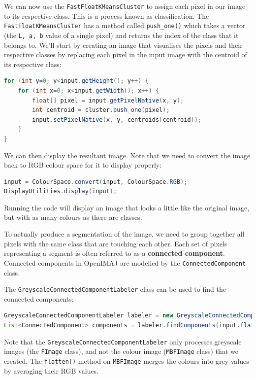 \documentclass[10pt,a4paper,twoside,extrafontsizes]{memoir}
\begin{document}
We can now use the \verb+FastFloatKMeansCluster+ to assign each pixel in our image to its respective 
class. This is a process known as classification. The \verb+FastFloatKMeansCluster+ has a method 
called \verb+push_one()+ which takes a vector (the \verb+L, a, b+ value of a single pixel) and 
returns the index of the class that it belongs to. We'll start by creating an image that 
visualises the pixels and their respective classes by replacing each pixel in the input image 
with the centroid of its respective class:
\begin{lstlisting}[language=java]
for (int y=0; y<input.getHeight(); y++) {
    for (int x=0; x<input.getWidth(); x++) {
        float[] pixel = input.getPixelNative(x, y);
        int centroid = cluster.push_one(pixel);
        input.setPixelNative(x, y, centroids[centroid]);
    }
}
\end{lstlisting}
We can then display the resultant image. Note that we need to convert the image back to RGB 
colour space for it to display properly:
\begin{lstlisting}[language=java]
input = ColourSpace.convert(input, ColourSpace.RGB);
DisplayUtilities.display(input);
\end{lstlisting}
Running the code will display an image that looks a little like the original image, but with 
as many colours as there are classes.

To actually produce a segmentation of the image, we need to group together all pixels with 
the same class that are touching each other. Each set of pixels representing a segment is 
often referred to as a \textbf{connected component}. Connected components in OpenIMAJ are
modelled by the \verb+ConnectedComponent+ class.

The \verb+GreyscaleConnectedComponentLabeler+ class can be used to find the connected components:
\begin{lstlisting}[language=java]
GreyscaleConnectedComponentLabeler labeler = new GreyscaleConnectedComponentLabeler();
List<ConnectedComponent> components = labeler.findComponents(input.flatten());
\end{lstlisting}
Note that the \verb+GreyscaleConnectedComponentLabeler+ 
only processes greyscale images 
(the \verb+FImage+ class), and not the colour image (\verb+MBFImage+ class) that we created. 
The \verb+flatten()+ method on \verb+MBFImage+ merges the colours into grey values by 
averaging their RGB values.
\end{document}
